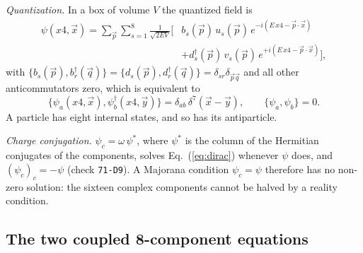 \emph{Quantization.} In a box of volume $V$ the quantized field is
\begin{align}
\psi(x4,\vec x)=\sum_{\vec p}\sum_{s=1}^{8}\frac{1}{\sqrt{2EV}}\Big[&b_s(\vec p)\,u_s(\vec p)\,e^{-i(E\,x4-\vec p\cdot\vec x)}\nonumber\\
&+d_s^\dagger(\vec p)\,v_s(\vec p)\,e^{+i(E\,x4-\vec p\cdot\vec x)}\Big],
\label{eq:modes}
\end{align}
with $\{b_s(\vec p),b_r^\dagger(\vec q)\}=\{d_s(\vec p),d_r^\dagger(\vec q)\}=\delta_{sr}\delta_{\vec p\vec q}$
and all other anticommutators zero, which is equivalent to
\begin{equation}
\{\psi_a(x4,\vec x),\psi_b^\dagger(x4,\vec y)\}=\delta_{ab}\,\delta^7(\vec x-\vec y),\qquad\{\psi_a,\psi_b\}=0 .
\label{eq:car}
\end{equation}
A particle has eight internal states, and so has its antiparticle.

\emph{Charge conjugation.} $\psi_c=\omega\,\psi^*$, where $\psi^*$ is the column of the Hermitian
conjugates of the components, solves Eq.~(\ref{eq:dirac}) whenever $\psi$ does, and
$(\psi_c)_c=-\psi$ (check \texttt{71-D9}). A Majorana condition $\psi_c=\psi$ therefore has no
non-zero solution: the sixteen complex components cannot be halved by a reality condition.

\subsection{The two coupled 8-component equations}

